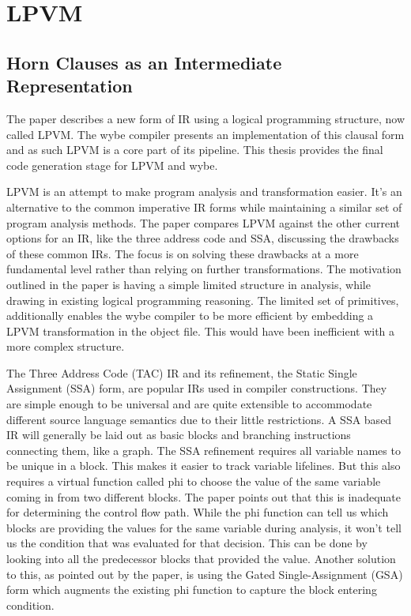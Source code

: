 \chapter{LPVM}

\section{Horn Clauses as an Intermediate Representation}

\cite{lpvm2015}

The paper describes a new form of IR using a logical programming structure, now
called LPVM. The wybe compiler presents an implementation of this clausal form
and as such LPVM is a core part of its pipeline. This thesis provides the final
code generation stage for LPVM and wybe.

LPVM is an attempt to make program analysis and transformation easier. It's an
alternative to the common imperative IR forms while maintaining a similar set
of program analysis methods. The paper compares LPVM against the other current
options for an IR, like the three address code and SSA, discussing the
drawbacks of these common IRs. The focus is on solving these drawbacks at a
more fundamental level rather than relying on further transformations. The
motivation outlined in the paper is having a simple limited structure in
analysis, while drawing in existing logical programming reasoning. The limited
set of primitives, additionally enables the wybe compiler to be more efficient
by embedding a LPVM transformation in the object file. This would have been
inefficient with a more complex structure.

The Three Address Code (TAC) IR and its refinement, the Static Single
Assignment (SSA) form, are popular IRs used in compiler constructions. They are
simple enough to be universal and are quite extensible to accommodate different
source language semantics due to their little restrictions. A SSA based IR will
generally be laid out as basic blocks and branching instructions connecting
them, like a graph. The SSA refinement requires all variable names to be unique
in a block. This makes it easier to track variable lifelines. But
this also requires a virtual function called phi to choose the value of the
same variable coming in from two different blocks. The paper points out that
this is inadequate for determining the control flow path. While the phi
function can tell us which blocks are providing the values for the same
variable during analysis, it won't tell us the condition that was evaluated for
that decision. This can be done by looking into all the predecessor blocks that
provided the value. Another solution to this, as pointed out by the paper, is
using the Gated Single-Assignment (GSA) form which augments the existing phi
function to capture the block entering condition.

